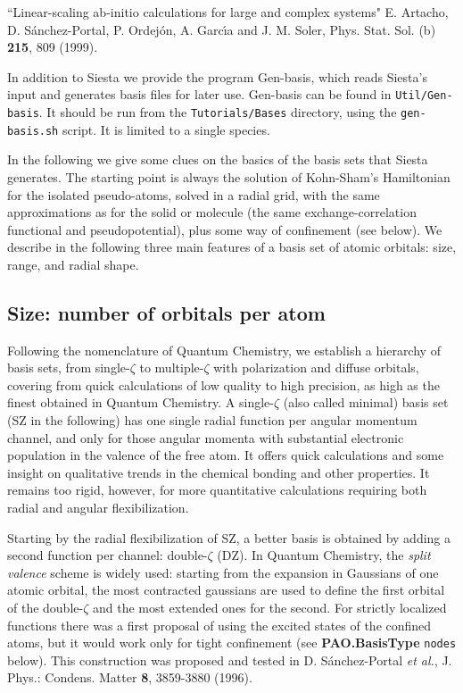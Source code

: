 \documentclass[11pt]{article}
\begin{document}
\noindent
``Linear-scaling ab-initio calculations for large and complex systems"
E. Artacho, D. S\'anchez-Portal, P. Ordej\'on, A. Garc\'{\i}a and
J. M. Soler, Phys. Stat. Sol. (b) {\bf 215}, 809 (1999).

In addition to {\sc Siesta} we provide the program {\sc
Gen-basis}, which reads {\sc
Siesta}'s input and generates basis files for later use. {\sc
Gen-basis} can be found in {\tt Util/Gen-basis}.
It should be run from the {\tt Tutorials/Bases} directory, 
using the {\tt gen-basis.sh} script. It is limited to a single species.

In the following we give some clues on the basics of the basis sets
that {\sc Siesta} generates. 
  The starting point is always the solution of Kohn-Sham's Hamiltonian
for the isolated pseudo-atoms, solved in a radial grid,
with the same approximations as for the solid or molecule 
(the same exchange-correlation functional and  pseudopotential),
plus some way of confinement (see below).
  We describe in the following three main features of a
basis set of atomic orbitals: size, range, and radial shape.

\subsection{Size: number of orbitals per atom}

  Following the nomenclature of Quantum Chemistry, we establish
a hierarchy of basis sets, from single-$\zeta$ to multiple-$\zeta$ 
with polarization and diffuse orbitals, covering from quick calculations
of low quality to high precision, as high as the finest obtained in
Quantum Chemistry. 
  A single-$\zeta$ (also called minimal) basis set (SZ in the following)
has one single radial function per angular momentum channel, and only for 
those angular momenta with substantial electronic population in the valence of
the free atom.
  It offers quick calculations and some insight on qualitative trends 
in the chemical bonding and other properties. 
  It remains too rigid, however, for more quantitative calculations
requiring both radial and angular flexibilization.

  Starting by the radial flexibilization of SZ, a better basis is obtained 
by adding a second function per channel: double-$\zeta$ (DZ).
  In Quantum Chemistry, the {\it split valence} scheme
is widely used: starting from the expansion in Gaussians of one atomic 
orbital, the most contracted gaussians are used to define the first
orbital of the double-$\zeta$ and the most extended ones for the second.
  For strictly localized functions there was a first proposal
of using the excited states of the confined atoms, but it would work only 
for tight confinement (see {\bf PAO.BasisType} {\tt nodes} below).
  This construction was proposed and tested in D. S\'anchez-Portal 
{\it et al.}, J. Phys.: Condens. Matter {\bf 8}, 3859-3880 (1996).
 
\end{document}
